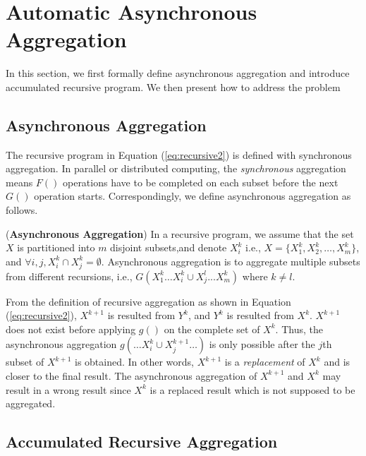 \section{Automatic Asynchronous Aggregation}
\label{sec:async}
In this section, we first formally define asynchronous aggregation and introduce accumulated recursive program. We then present how to address the problem 

\subsection{Asynchronous Aggregation}
\label{sec:async:async}

The recursive program in Equation (\ref{eq:recursive2}) is defined with synchronous aggregation. In parallel or distributed computing, the \emph{synchronous} aggregation means $F()$ operations have to be completed on each subset before the next $G()$ operation starts. %
Correspondingly, we define asynchronous aggregation as follows.

\begin{definition}
	\label{def:asyncaggre}
	(\textbf{Asynchronous Aggregation}) In a recursive program, we assume that the set $X$  is partitioned into $m$ disjoint subsets,and denote $X_i^k$ i.e., $X=\{X_1^k,X_2^k,\ldots,X_m^k\}$, and $\forall i,j, X_i^k\cap X_j^k=\emptyset$. Asynchronous aggregation is to aggregate multiple subsets from different recursions, i.e., $G(X_1^k \ldots X_i^k\cup X_j^{l}...X_m^k)$ where $k\neq l$.
\end{definition}

From the definition of recursive aggregation as shown in Equation (\ref{eq:recursive2}), $X^{k+1}$ is resulted from $Y^k$, and $Y^k$ is resulted from $X^k$. $X^{k+1}$ does not exist before applying $g()$ on the complete set of $X^k$. Thus, the asynchronous aggregation $g(\ldots X_i^k\cup X_j^{k+1} \ldots)$ is only possible after the $j$th subset of $X^{k+1}$ is obtained. In other words, $X^{k+1}$ is a \emph{replacement} of $X^k$ and is closer to the final result. The asynchronous aggregation of $X^{k+1}$ and $X^k$ may result in a wrong result since $X^k$ is a replaced result which is not supposed to be aggregated.

\subsection{Accumulated Recursive Aggregation}
\label{sec:async:accrec}

